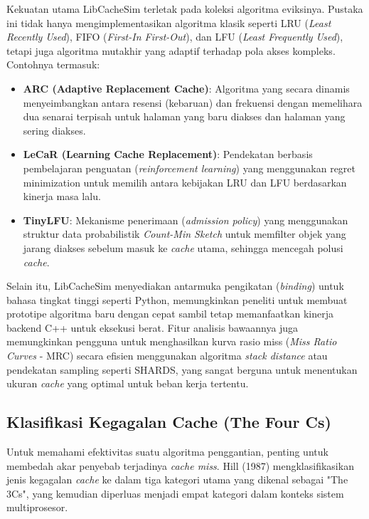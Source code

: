 Kekuatan utama LibCacheSim terletak pada koleksi algoritma eviksinya.
Pustaka ini tidak hanya mengimplementasikan algoritma klasik seperti
LRU (\textit{Least Recently Used}), FIFO (\textit{First-In First-Out}),
dan LFU (\textit{Least Frequently Used}), tetapi juga algoritma
mutakhir yang adaptif terhadap pola akses kompleks.
Contohnya termasuk:
\begin{itemize}
  \item \textbf{ARC (Adaptive Replacement Cache)}: Algoritma yang secara
    dinamis menyeimbangkan antara resensi (kebaruan) dan frekuensi
    dengan memelihara dua senarai terpisah untuk halaman yang baru diakses
    dan halaman yang sering diakses.
  \item \textbf{LeCaR (Learning Cache Replacement)}: Pendekatan berbasis
    pembelajaran penguatan (\textit{reinforcement learning}) yang menggunakan
    regret minimization untuk memilih antara kebijakan LRU dan LFU
    berdasarkan kinerja masa lalu.
  \item \textbf{TinyLFU}: Mekanisme penerimaan (\textit{admission policy})
    yang menggunakan struktur data probabilistik \textit{Count-Min Sketch}
    untuk memfilter objek yang jarang diakses sebelum masuk ke
    \textit{cache} utama,
    sehingga mencegah polusi \textit{cache}.
\end{itemize}

Selain itu, LibCacheSim menyediakan antarmuka pengikatan (\textit{binding})
untuk bahasa tingkat tinggi seperti Python, memungkinkan peneliti untuk
membuat prototipe algoritma baru dengan cepat sambil tetap memanfaatkan
kinerja backend C++ untuk eksekusi berat.
Fitur analisis bawaannya juga memungkinkan pengguna untuk menghasilkan
kurva rasio miss (\textit{Miss Ratio Curves} - MRC) secara efisien
menggunakan algoritma \textit{stack distance} atau pendekatan sampling
seperti SHARDS, yang sangat berguna untuk menentukan ukuran \textit{cache}
yang optimal untuk beban kerja tertentu.

\subsection{Klasifikasi Kegagalan Cache (The Four Cs)}
Untuk memahami efektivitas suatu algoritma penggantian, penting untuk
membedah akar penyebab terjadinya \textit{cache miss}. Hill (1987)
mengklasifikasikan jenis kegagalan \textit{cache} ke dalam tiga
kategori utama yang dikenal sebagai "The 3Cs", yang kemudian
diperluas menjadi empat kategori dalam konteks sistem multiprosesor.

